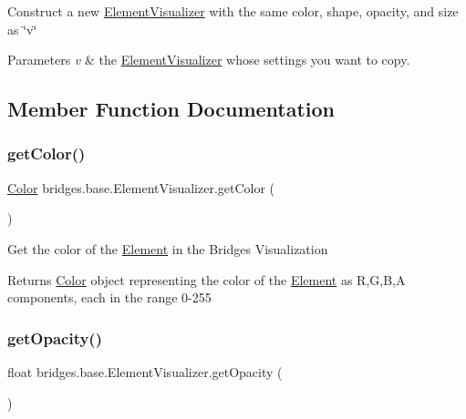 Construct a new \hyperlink{classbridges_1_1base_1_1_element_visualizer}{Element\+Visualizer} with the same color, shape, opacity, and size as \char`\"{}v\char`\"{}


\begin{DoxyParams}{Parameters}
{\em v} & the \hyperlink{classbridges_1_1base_1_1_element_visualizer}{Element\+Visualizer} whose settings you want to copy. \\
\hline
\end{DoxyParams}


\subsection{Member Function Documentation}
\hypertarget{classbridges_1_1base_1_1_element_visualizer_a3bf821b9bfa02746882bac934ce4fb8e}{}\label{classbridges_1_1base_1_1_element_visualizer_a3bf821b9bfa02746882bac934ce4fb8e} 
\subsubsection{\texorpdfstring{get\+Color()}{getColor()}}
{\footnotesize\ttfamily \hyperlink{classbridges_1_1base_1_1_color}{Color} bridges.\+base.\+Element\+Visualizer.\+get\+Color (\begin{DoxyParamCaption}{ }\end{DoxyParamCaption})}

Get the color of the \hyperlink{classbridges_1_1base_1_1_element}{Element} in the Bridges Visualization

\begin{DoxyReturn}{Returns}
\hyperlink{classbridges_1_1base_1_1_color}{Color} object representing the color of the \hyperlink{classbridges_1_1base_1_1_element}{Element} as R,G,B,A components, each in the range 0-\/255 
\end{DoxyReturn}
\hypertarget{classbridges_1_1base_1_1_element_visualizer_ab86ff39f17f8d1766670b18be88b5492}{}\label{classbridges_1_1base_1_1_element_visualizer_ab86ff39f17f8d1766670b18be88b5492} 
\subsubsection{\texorpdfstring{get\+Opacity()}{getOpacity()}}
{\footnotesize\ttfamily float bridges.\+base.\+Element\+Visualizer.\+get\+Opacity (\begin{DoxyParamCaption}{ }\end{DoxyParamCaption})}

